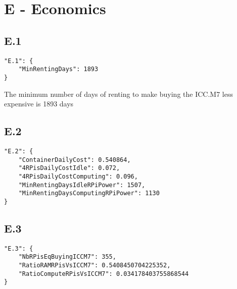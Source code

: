 \documentclass{article}
\begin{document}
\section{E - Economics}

\subsection{E.1}
\begin{lstlisting}[style=json]
"E.1": {
    "MinRentingDays": 1893
}
\end{lstlisting}
The minimum number of days of renting to make buying the ICC.M7 less expensive is 1893 days

\subsection{E.2}
\begin{lstlisting}[style=json]
"E.2": {
    "ContainerDailyCost": 0.540864,
    "4RPisDailyCostIdle": 0.072,
    "4RPisDailyCostComputing": 0.096,
    "MinRentingDaysIdleRPiPower": 1507,
    "MinRentingDaysComputingRPiPower": 1130
}
\end{lstlisting}

\subsection{E.3}
\begin{lstlisting}[style=json]
"E.3": {
    "NbRPisEqBuyingICCM7": 355,
    "RatioRAMRPisVsICCM7": 0.5408450704225352,
    "RatioComputeRPisVsICCM7": 0.034178403755868544
}
\end{lstlisting}
\end{document}
